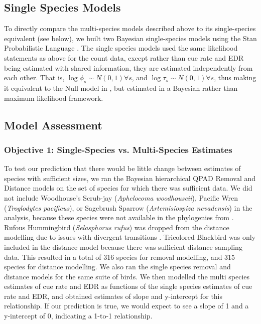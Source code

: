 \subsection{Single Species Models}

\par To directly compare the multi-species models described above to its single-species equivalent (see below), we built two Bayesian single-species models using the Stan Probabilistic Language \citep{stan_development_team_stan_2024}.
The single species models used the same likelihood statements as above for the count data, except rather than cue rate and EDR being estimated with shared information, they are estimated independently from each other.
That is, $\log \phi_s \sim N(0,1) \forall s$, and $\log \tau_s \sim N(0,1) \forall s$, thus making it equivalent to the Null model in \citet{edwards_point_2023}, but estimated in a Bayesian rather than maximum likelihood framework. 

\subsection{Model Assessment}
\subsubsection{Objective 1: Single-Species vs. Multi-Species Estimates}
\par To test our prediction that there would be little change between estimates of species with sufficient sizes, we ran the Bayesian hierarchical QPAD Removal and Distance models on the set of species for which there was sufficient data.
We did not include Woodhouse's Scrub-jay (\textit{Aphelocoma woodhouseii}), Pacific Wren (\textit{Troglodytes pacificus}), or Sagebrush Sparrow (\textit{Artemisiospiza nevadensis}) in the analysis, because these species were not available in the phylogenies from \citet{jetz_global_2012}.
Rufous Hummingbird (\textit{Selasphorus rufus}) was dropped from the distance modelling due to issues with divergent transitions \citep{betancourt_diagnosing_2016, leimkuhler_simulating_2005}.
Tricolored Blackbird was only included in the distance model because there was sufficient distance sampling data.
This resulted in a total of 316 species for removal modelling, and 315 species for distance modelling.
We also ran the single species removal and distance models for the same suite of birds.
We then modelled the multi species estimates of cue rate and EDR as functions of the single species estimates of cue rate and EDR, and obtained estimates of slope and y-intercept for this relationship.
If our prediction is true, we would expect to see a slope of 1 and a y-intercept of 0, indicating a 1-to-1 relationship.

